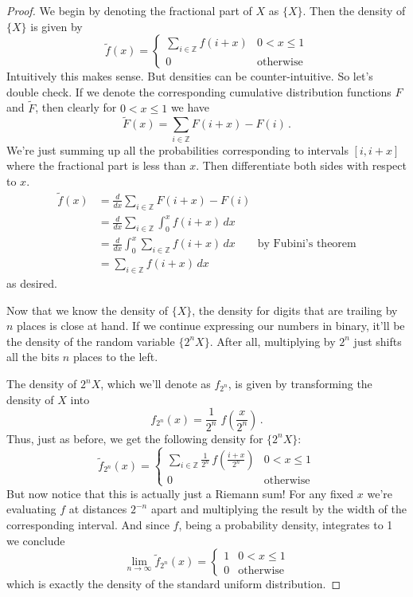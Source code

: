 \documentclass{article}
\theoremstyle{theorem}
\theoremstyle{definition}
\begin{document}
\begin{proof}
We begin by denoting the fractional part of $X$ as $\{X\}$. Then the density of $\{X\}$ is given by
\[
\tilde{f}(x) =
\begin{cases}
\sum_{i\in\mathbb{Z}}f(i+x) & 0 < x \leq 1\\
0 & \text{otherwise}
\end{cases}
\]
Intuitively this makes sense. But densities can be counter-intuitive. So let's double check. If we denote the corresponding cumulative distribution functions $F$ and $\tilde{F}$, then clearly for $0<x\leq1$ we have
\[
\tilde{F}(x) = \sum_{i\in\mathbb{Z}}F(i+x)-F(i)\,.
\]
We're just summing up all the probabilities corresponding to intervals $[i,i+x]$ where the fractional part is less than $x$. Then differentiate both sides with respect to $x$.
\[
\begin{split}
\tilde{f}(x) & =\frac{d}{dx}\sum_{i\in\mathbb{Z}}F(i+x)-F(i)\\
& =\frac{d}{dx}\sum_{i\in\mathbb{Z}}\int_0^x f(i+x)\,dx\\
& =\frac{d}{dx}\int_0^x\sum_{i\in\mathbb{Z}}f(i+x)\,dx\qquad\text{by Fubini's theorem}\\
& =\sum_{i\in\mathbb{Z}}f(i+x)\,dx
\end{split}
\]
as desired.

Now that we know the density of $\{X\}$, the density for digits that are trailing by $n$ places is close at hand. If we continue expressing our numbers in binary, it'll be the density of the random variable $\{2^nX\}$. After all, multiplying by $2^n$ just shifts all the bits $n$ places to the left.

The density of $2^nX$, which we'll denote as $f_{2^n}$, is given by transforming the density of $X$ into
\[
f_{2^n}(x) = \frac{1}{2^n}\;f\left(\frac{x}{2^n}\right)\,.
\]
Thus, just as before, we get the following density for $\{2^nX\}$:
\[
\tilde{f}_{2^n}(x)=
\begin{cases}
\sum_{i\in\mathbb{Z}}\frac{1}{2^n}\,f\left(\frac{i+x}{2^n}\right) & 0<x\leq 1\\
0 & \text{otherwise}
\end{cases}
\]
But now notice that this is actually just a Riemann sum! For any fixed $x$ we're evaluating $f$ at distances $2^{-n}$ apart and multiplying the result by the width of the corresponding interval. And since $f$, being a probability density, integrates to 1 we conclude
\[
\lim_{n\rightarrow\infty}\tilde{f}_{2^n}(x) = 
\begin{cases}
1 & 0<x\leq 1\\
0 & \text{otherwise}
\end{cases}
\]
which is exactly the density of the standard uniform distribution.
\end{proof}
\end{document}
